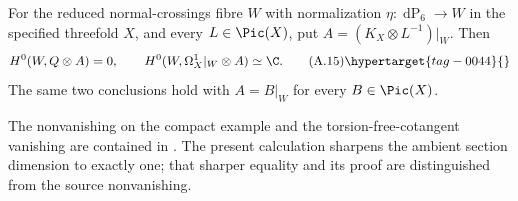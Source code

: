 \begin{proposition}\hypertarget{tag-01AQ}{}\label{cdp:st:A.4.1}

For the reduced normal-crossings fibre $W$ with normalization $\eta:\operatorname{dP}_6\to W$ in the specified threefold $X$, and every $L\in\Pic(X)$, put $A=(K_X\otimes L^{-1})|_W$. Then
\[
H^0(W,Q\otimes A)=0,
\qquad H^0(W,\Omega_X^1|_W\otimes A)\simeq\C.
\tag{A.15}\hypertarget{tag-0044}{}\label{cdp:eq:A.15}
\]
The same two conclusions hold with $A=B|_W$ for every $B\in\Pic(X)$.
\end{proposition}



The nonvanishing on the compact example and the torsion-free-cotangent vanishing are contained in \citet[Theorem~10.5 and Section~10.4]{AC2026}. The present calculation sharpens the ambient section dimension to exactly one; that sharper equality and its proof are distinguished from the source nonvanishing.

